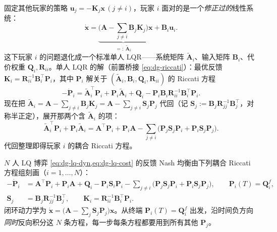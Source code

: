 \begin{derivation}
\label{deriv:dg-coupled}
固定其他玩家的策略 $\mathbf u_j=-\mathbf K_j\mathbf x\,(j\ne i)$，玩家 $i$ 面对的是一个\emph{修正过的}线性系统：
\[
  \dot{\mathbf x}=\underbrace{\Big(\mathbf A-\sum_{j\ne i}\mathbf B_j\mathbf K_j\Big)}_{=:\ \tilde{\mathbf A}_i}\mathbf x+\mathbf B_i \mathbf u_i.
\]
这下玩家 $i$ 的问题退化成一个标准单人 LQR——系统矩阵 $\tilde{\mathbf A}_i$、输入矩阵 $\mathbf B_i$、代价权重 $\mathbf Q_i,\mathbf R_{ii}$。单人 LQR 的解（前置桥接 \cref{eq:dg-riccati}）：最优反馈 $\mathbf K_i=\mathbf R_{ii}^{-1}\mathbf B_i^\top \mathbf P_i$，其中 $\mathbf P_i$ 解关于 $(\tilde{\mathbf A}_i,\mathbf B_i,\mathbf Q_i,\mathbf R_{ii})$ 的 Riccati 方程
\[
  -\dot{\mathbf P}_i=\tilde{\mathbf A}_i^\top \mathbf P_i+\mathbf P_i\tilde{\mathbf A}_i+\mathbf Q_i-\mathbf P_i\mathbf B_i\mathbf R_{ii}^{-1}\mathbf B_i^\top \mathbf P_i.
\]
现在把 $\tilde{\mathbf A}_i=\mathbf A-\sum_{j\ne i}\mathbf B_j\mathbf K_j=\mathbf A-\sum_{j\ne i}\mathbf S_j\mathbf P_j$ 代回（记 $\mathbf S_j:=\mathbf B_j\mathbf R_{jj}^{-1}\mathbf B_j^\top$，对称半正定），展开那两个含 $\tilde{\mathbf A}_i$ 的项：
\[
  \tilde{\mathbf A}_i^\top \mathbf P_i+\mathbf P_i\tilde{\mathbf A}_i=\mathbf A^\top \mathbf P_i+\mathbf P_i\mathbf A-\sum_{j\ne i}\big(\mathbf P_j\mathbf S_j\mathbf P_i+\mathbf P_i\mathbf S_j\mathbf P_j\big).
\]
代回整理即得玩家 $i$ 的耦合 Riccati 方程。
\end{derivation}

\begin{theorem}
\label{thm:dg-coupled}
$N$ 人 LQ 博弈 \cref{eq:dg-lq-dyn,eq:dg-lq-cost} 的反馈 Nash 均衡由下列耦合 Riccati 方程组刻画（$i=1,\dots,N$）：
\begin{align}
  -\dot{\mathbf P}_i&=\mathbf A^\top \mathbf P_i+\mathbf P_i\mathbf A+\mathbf Q_i-\mathbf P_i\mathbf S_i\mathbf P_i-\sum_{j\ne i}\big(\mathbf P_j\mathbf S_j\mathbf P_i+\mathbf P_i\mathbf S_j\mathbf P_j\big),\qquad \mathbf P_i(T)=\mathbf Q_i^f, \label{eq:dg-coupled}\\
  \mathbf S_j&=\mathbf B_j\mathbf R_{jj}^{-1}\mathbf B_j^\top,\qquad \mathbf K_i=\mathbf R_{ii}^{-1}\mathbf B_i^\top \mathbf P_i. \label{eq:dg-gain}
\end{align}
闭环动力学为 $\dot{\mathbf x}=\big(\mathbf A-\sum_j \mathbf S_j\mathbf P_j\big)\mathbf x$。从终端 $\mathbf P_i(T)=\mathbf Q_i^f$ 出发，沿时间负方向\emph{同时}反向积分这 $N$ 条方程，每一步每条方程都要用到所有其他 $\mathbf P_j$。
\end{theorem}

